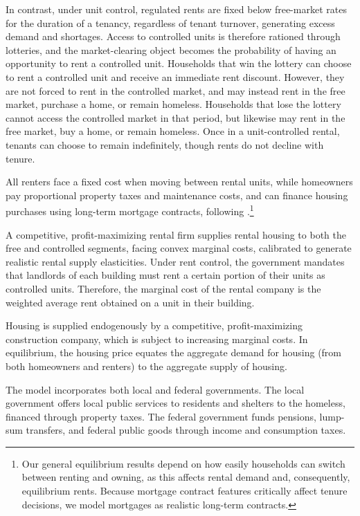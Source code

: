 \documentclass[parskip=full]{article}
\begin{document}
In contrast, under unit control, regulated rents are fixed below free-market rates for the duration of a tenancy, regardless of tenant turnover, generating excess demand and shortages. Access to controlled units is therefore rationed through lotteries, and the market-clearing object becomes the probability of having an opportunity to rent a controlled unit. Households that win the lottery can choose to rent a controlled unit and receive an immediate rent discount. However, they are not forced to rent in the controlled market, and may instead rent in the free market, purchase a home, or remain homeless. Households that lose the lottery cannot access the controlled market in that period, but likewise may rent in the free market, buy a home, or remain homeless. Once in a unit-controlled rental, tenants can choose to remain indefinitely, though rents do not decline with tenure.

All renters face a fixed cost when moving between rental units, while homeowners pay proportional property taxes and maintenance costs, and can finance housing purchases using long-term mortgage contracts, following \citet{kkk-2021}.\footnote{Our general equilibrium results depend on how easily households can switch between renting and owning, as this affects rental demand and, consequently, equilibrium rents. Because mortgage contract features critically affect tenure decisions, we model mortgages as realistic long-term contracts.} 

A competitive, profit-maximizing rental firm supplies rental housing to both the free and controlled segments, facing convex marginal costs, calibrated to generate realistic rental supply elasticities. Under rent control, the government mandates that landlords of each building must rent a certain portion of their units as controlled units. Therefore, the marginal cost of the rental company is the weighted average rent obtained on a unit in their building. 

Housing is supplied endogenously by a competitive, profit-maximizing construction company, which is subject to increasing marginal costs. In equilibrium, the housing price equates the aggregate demand for housing (from both homeowners and renters) to the aggregate supply of housing.

The model incorporates both local and federal governments. The local government offers local public services to residents and shelters to the homeless, financed through property taxes. The federal government funds pensions, lump-sum transfers, and federal public goods through income and consumption taxes.
\end{document}
